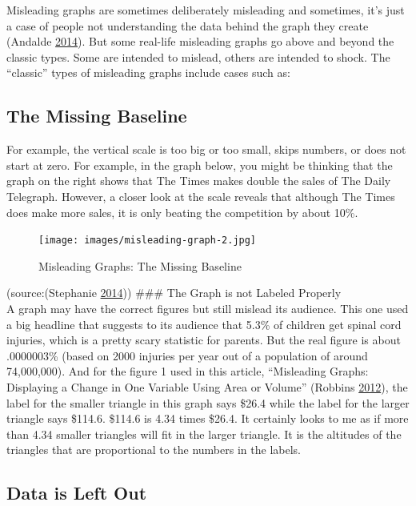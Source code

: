 \documentclass[]{book}
\begin{document}
Misleading graphs are sometimes deliberately misleading and sometimes,
it's just a case of people not understanding the data behind the graph
they create (Andalde \protect\hyperlink{ref-andale_2014}{2014}). But
some real-life misleading graphs go above and beyond the classic types.
Some are intended to mislead, others are intended to shock. The
``classic'' types of misleading graphs include cases such as:

\subsection{The Missing Baseline}\label{the-missing-baseline}

For example, the vertical scale is too big or too small, skips numbers,
or does not start at zero. For example, in the graph below, you might be
thinking that the graph on the right shows that The Times makes double
the sales of The Daily Telegraph. However, a closer look at the scale
reveals that although The Times does make more sales, it is only beating
the competition by about 10\%.

\begin{figure}
\centering
\texttt{[image: images/misleading-graph-2.jpg]}
\caption{Misleading Graphs: The Missing Baseline}
\end{figure}

(source:(Stephanie \protect\hyperlink{ref-missing_baseline}{2014}))
\#\#\# The Graph is not Labeled Properly\\
A graph may have the correct figures but still mislead its audience.
This one used a big headline that suggests to its audience that 5.3\% of
children get spinal cord injuries, which is a pretty scary statistic for
parents. But the real figure is about .0000003\% (based on 2000 injuries
per year out of a population of around 74,000,000). And for the figure 1
used in this article, ``Misleading Graphs: Displaying a Change in One
Variable Using Area or Volume'' (Robbins
\protect\hyperlink{ref-scaling_issues}{2012}), the label for the smaller
triangle in this graph says \$26.4 while the label for the larger
triangle says \$114.6. \$114.6 is 4.34 times \$26.4. It certainly looks
to me as if more than 4.34 smaller triangles will fit in the larger
triangle. It is the altitudes of the triangles that are proportional to
the numbers in the labels.

\subsection{Data is Left Out}\label{data-is-left-out}
\end{document}
